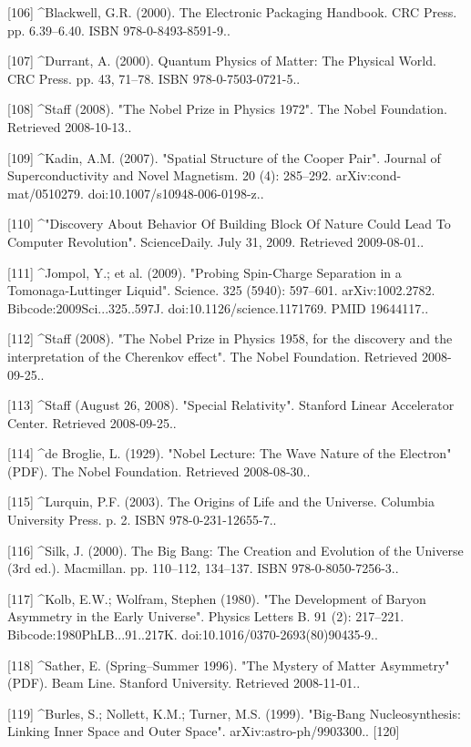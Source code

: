 [106]
^Blackwell, G.R. (2000). The Electronic Packaging Handbook. CRC Press. pp. 6.39–6.40. ISBN 978-0-8493-8591-9..

[107]
^Durrant, A. (2000). Quantum Physics of Matter: The Physical World. CRC Press. pp. 43, 71–78. ISBN 978-0-7503-0721-5..

[108]
^Staff (2008). "The Nobel Prize in Physics 1972". The Nobel Foundation. Retrieved 2008-10-13..

[109]
^Kadin, A.M. (2007). "Spatial Structure of the Cooper Pair". Journal of Superconductivity and Novel Magnetism. 20 (4): 285–292. arXiv:cond-mat/0510279. doi:10.1007/s10948-006-0198-z..

[110]
^"Discovery About Behavior Of Building Block Of Nature Could Lead To Computer Revolution". ScienceDaily. July 31, 2009. Retrieved 2009-08-01..

[111]
^Jompol, Y.; et al. (2009). "Probing Spin-Charge Separation in a Tomonaga-Luttinger Liquid". Science. 325 (5940): 597–601. arXiv:1002.2782. Bibcode:2009Sci...325..597J. doi:10.1126/science.1171769. PMID 19644117..

[112]
^Staff (2008). "The Nobel Prize in Physics 1958, for the discovery and the interpretation of the Cherenkov effect". The Nobel Foundation. Retrieved 2008-09-25..

[113]
^Staff (August 26, 2008). "Special Relativity". Stanford Linear Accelerator Center. Retrieved 2008-09-25..

[114]
^de Broglie, L. (1929). "Nobel Lecture: The Wave Nature of the Electron" (PDF). The Nobel Foundation. Retrieved 2008-08-30..

[115]
^Lurquin, P.F. (2003). The Origins of Life and the Universe. Columbia University Press. p. 2. ISBN 978-0-231-12655-7..

[116]
^Silk, J. (2000). The Big Bang: The Creation and Evolution of the Universe (3rd ed.). Macmillan. pp. 110–112, 134–137. ISBN 978-0-8050-7256-3..

[117]
^Kolb, E.W.; Wolfram, Stephen (1980). "The Development of Baryon Asymmetry in the Early Universe". Physics Letters B. 91 (2): 217–221. Bibcode:1980PhLB...91..217K. doi:10.1016/0370-2693(80)90435-9..

[118]
^Sather, E. (Spring–Summer 1996). "The Mystery of Matter Asymmetry" (PDF). Beam Line. Stanford University. Retrieved 2008-11-01..

[119]
^Burles, S.; Nollett, K.M.; Turner, M.S. (1999). "Big-Bang Nucleosynthesis: Linking Inner Space and Outer Space". arXiv:astro-ph/9903300..
[120]

